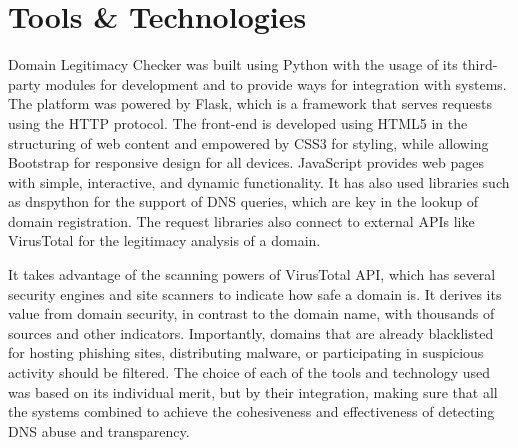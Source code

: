 \section{Tools \& Technologies}

Domain Legitimacy Checker was built using Python with the usage of its third-party modules for development and to provide ways for integration with systems. The platform was powered by Flask, which is a framework that serves requests using the HTTP protocol. The front-end is developed using HTML5 in the structuring of web content and empowered by CSS3 for styling, while allowing Bootstrap for responsive design for all devices. JavaScript provides web pages with simple, interactive, and dynamic functionality. It has also used libraries such as dnspython for the support of DNS queries, which are key in the lookup of domain registration. The request libraries also connect to external APIs like VirusTotal for the legitimacy analysis of a domain.


It takes advantage of the scanning powers of VirusTotal API, which has several security engines and site scanners to indicate how safe a domain is. It derives its value from domain security, in contrast to the domain name, with thousands of sources and other indicators. Importantly, domains that are already blacklisted for hosting phishing sites, distributing malware, or participating in suspicious activity should be filtered. The choice of each of the tools and technology used was based on its individual merit, but by their integration, making sure that all the systems combined to achieve the cohesiveness and effectiveness of detecting DNS abuse and transparency.



